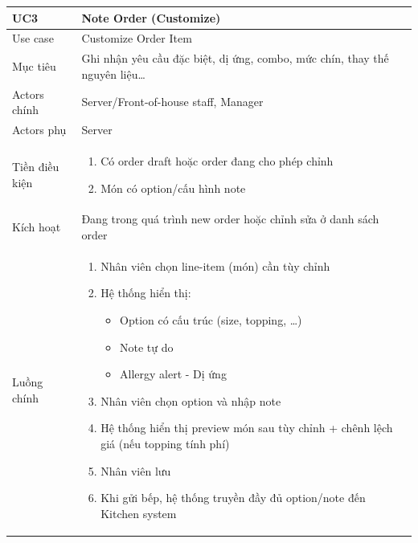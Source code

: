 \begin{longtable}{|>{\raggedright\arraybackslash}p{}|>{\raggedright\arraybackslash}p{}|}
\hline
\textbf{UC3} & \textbf{Note Order (Customize)} \\
\hline
Use case & Customize Order Item \\
\hline
Mục tiêu & Ghi nhận yêu cầu đặc biệt, dị ứng, combo, mức chín, thay thế nguyên liệu… \\
\hline
Actors chính & Server/Front-of-house staff, Manager \\
\hline
Actors phụ & Server \\
\hline
Tiền điều kiện &
\vspace{-0.5em}
\begin{enumerate}[leftmargin=*]
\item Có order draft hoặc order đang cho phép chỉnh
\item Món có option/cấu hình note
\end{enumerate}
\vspace{-0.5em}
\\
\hline
Kích hoạt & Đang trong quá trình new order hoặc chỉnh sửa ở danh sách order \\
\hline
Luồng chính &
\vspace{-0.5em}
\begin{enumerate}[leftmargin=*]
\item Nhân viên chọn line-item (món) cần tùy chỉnh
\item Hệ thống hiển thị:
\vspace{-0.5em}
\begin{itemize}[leftmargin=*]
\item Option có cấu trúc (size, topping, …)
\item Note tự do
\item Allergy alert - Dị ứng
\end{itemize}
\vspace{-0.5em}
\item Nhân viên chọn option và nhập note
\item Hệ thống hiển thị preview món sau tùy chỉnh + chênh lệch giá (nếu topping tính phí)
\item Nhân viên lưu
\item Khi gửi bếp, hệ thống truyền đầy đủ option/note đến Kitchen system
\end{enumerate}
\vspace{-0.5em}

\end{longtable}
